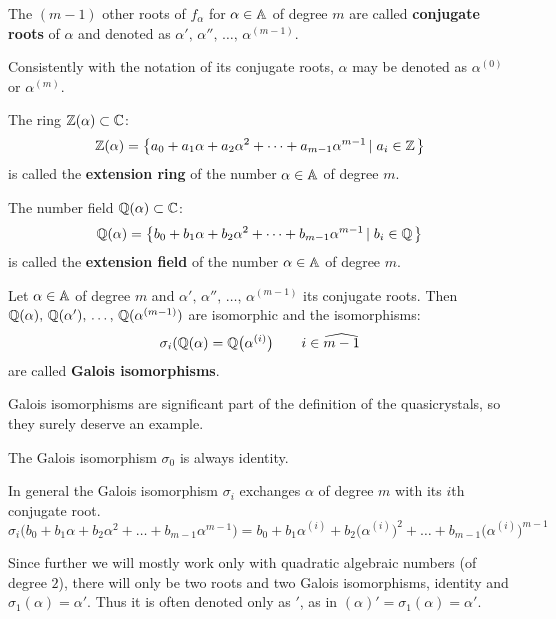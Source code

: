 \documentclass[text.tex]{subfiles}
\begin{document}
\begin{definition}
The $(m-1)$ other roots of $f_\alpha$ for $\alpha\in\mathbb{A}$ of degree $m$ are called \textbf{conjugate roots} of $\alpha$ and denoted as $\alpha',\,\alpha'',\,\dots,\,\alpha^{(m-1)}$. 
\end{definition}

\begin{remark}
Consistently with the notation of its conjugate roots, $\alpha$ may be denoted as $\alpha^{(0)}$ or $\alpha^{(m)}$.
\end{remark}

\begin{definition}
The ring $\mathbb{Z}(\alpha)\subset\mathbb{C}$: 
$$\mathbb{Z}(\alpha) = \left\{ a_0 + a_1\alpha + a_2\alpha^2 + \dots + a_{m-1}\alpha^{m-1} \left |\; a_i\in\mathbb{Z}\right. \right\}$$
is called the \textbf{extension ring} of the number $\alpha\in\mathbb{A}$ of degree $m$.
\end{definition}

\begin{definition}
The number field $\mathbb{Q}(\alpha)\subset\mathbb{C}$: 
$$\mathbb{Q}(\alpha) = \left\{ b_0 + b_1\alpha + b_2\alpha^2 + \dots + b_{m-1}\alpha^{m-1} \left |\; b_i\in\mathbb{Q}\right. \right\}$$
is called the \textbf{extension field} of the number $\alpha\in\mathbb{A}$ of degree $m$.
\end{definition}

\begin{definition}
Let $\alpha\in\mathbb{A}$ of degree $m$ and $\alpha',\,\alpha'',\,\dots,\,\alpha^{(m-1)}$ its conjugate roots. Then $\mathbb{Q}(\alpha),\, \mathbb{Q}(\alpha'),\,\dots,\, \mathbb{Q}(\alpha^{(m-1)})$ are isomorphic and the isomorphisms:
$$\sigma_i(\mathbb{Q}(\alpha) = \mathbb{Q}\big(\alpha^{(i)}\big)\qquad i\in\widehat{m-1}$$
are called \textbf{Galois isomorphisms}.
\end{definition}

Galois isomorphisms are significant part of the definition of the quasicrystals, so they surely deserve an example. 

The Galois isomorphism $\sigma_0$ is always identity.

In general the Galois isomorphism $\sigma_i$ exchanges $\alpha$ of degree $m$ with its $i$th conjugate root. 
$$\sigma_i\big(b_0 + b_1\alpha + b_2\alpha^2 + \dots + b_{m-1}\alpha^{m-1}\big) = b_0 + b_1\alpha^{(i)} + b_2\big(\alpha^{(i)}\big)^2 + \dots + b_{m-1}\big(\alpha^{(i)}\big)^{m-1}$$

Since further we will mostly work only with quadratic algebraic numbers (of degree $2$), there will only be two roots and two Galois isomorphisms, identity and $\sigma_1(\alpha) = \alpha'$. Thus it is often denoted only as $'$, as in $(\alpha)' = \sigma_1(\alpha) = \alpha'$.
\end{document}

